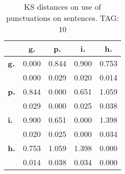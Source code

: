 \begin{table}[h!]
\begin{center}
\begin{tabular}{| l || c | c | c | c |}\hline
 & {\bf g.} & {\bf p.} & {\bf i.} & {\bf h.} \\\hline\hline
{\bf g.} & 0.000 & 0.844 & 0.900 & 0.753 \\
{\bf } & 0.000 & 0.029 & 0.020 & 0.014 \\\hline
{\bf p.} & 0.844 & 0.000 & 0.651 & 1.059 \\
{\bf } & 0.029 & 0.000 & 0.025 & 0.038 \\\hline
{\bf i.} & 0.900 & 0.651 & 0.000 & 1.398 \\
{\bf } & 0.020 & 0.025 & 0.000 & 0.034 \\\hline
{\bf h.} & 0.753 & 1.059 & 1.398 & 0.000 \\
{\bf } & 0.014 & 0.038 & 0.034 & 0.000 \\\hline
\end{tabular}
\caption{KS distances on use of punctuations on sentences. TAG: 10}
\end{center}
\end{table}